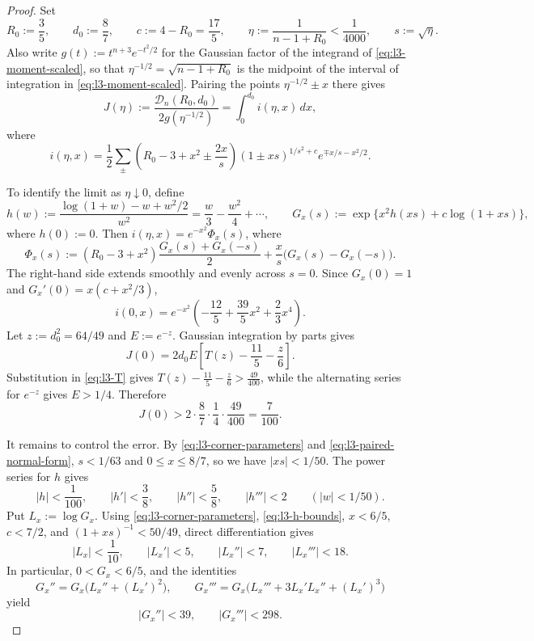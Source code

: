\documentclass[11pt]{article}
\numberwithin{equation}{section}
\theoremstyle{definition}
\begin{document}
\begin{proof}
Set
\begin{equation}\label{eq:l3-corner-parameters}
    R_0:=\frac35,\qquad d_0:=\frac87,\qquad
    c:=4-R_0=\frac{17}{5},\qquad
    \eta:=\frac1{n-1+R_0}<\frac1{4000},\qquad s:=\sqrt\eta.
\end{equation}
Also write $g(t):=t^{n+3}e^{-t^2/2}$ for the Gaussian factor of the
integrand of \eqref{eq:l3-moment-scaled}, so that
$\eta^{-1/2}=\sqrt{n-1+R_0}$ is the midpoint of the interval of
integration in \eqref{eq:l3-moment-scaled}. Pairing the points
$\eta^{-1/2}\pm x$ there gives
\begin{equation}\label{eq:l3-paired-normal-form}
 J(\eta):=\frac{\mathcal D_n(R_0,d_0)}{2g(\eta^{-1/2})}
 =\int_0^{d_0}i(\eta,x)\,dx,
\end{equation}
where
\[
 i(\eta,x)=\frac12\sum_{\pm}
 \left(R_0-3+x^2\pm\frac{2x}{s}\right)
 (1\pm xs)^{1/s^2+c}e^{\mp x/s-x^2/2}.
\]

To identify the limit as $\eta\downarrow0$, define
\[
 h(w):=\frac{\log(1+w)-w+w^2/2}{w^2}
 =\frac w3-\frac{w^2}4+\cdots,\qquad
 G_x(s):=\exp\{x^2h(xs)+c\log(1+xs)\},
\]
where $h(0):=0$. Then $i(\eta,x)=e^{-x^2}\Phi_x(s)$, where
\begin{equation}\label{eq:l3-Phi}
 \Phi_x(s):=(R_0-3+x^2)\frac{G_x(s)+G_x(-s)}2
 +\frac{x}{s}\bigl(G_x(s)-G_x(-s)\bigr).
\end{equation}
The right-hand side extends smoothly and evenly across $s=0$. Since
$G_x(0)=1$ and $G_x'(0)=x(c+x^2/3)$,
\[
 i(0,x)=e^{-x^2}\left(-\frac{12}{5}+\frac{39}{5}x^2
 +\frac23x^4\right).
\]
Let $z:=d_0^2=64/49$ and $E:=e^{-z}$. Gaussian integration by parts gives
\[
 J(0)=2d_0E\left[T(z)-\frac{11}{5}-\frac z6\right].
\]
Substitution in \eqref{eq:l3-T} gives
$T(z)-\frac{11}{5}-\frac z6>\frac{49}{400}$, while the alternating
series for $e^{-z}$ gives $E>1/4$. Therefore
\begin{equation}\label{eq:l3-J0}
    J(0)>2\cdot\frac87\cdot\frac14\cdot\frac{49}{400}
    =\frac7{100}.
\end{equation}

It remains to control the error. By \eqref{eq:l3-corner-parameters} and
\eqref{eq:l3-paired-normal-form}, $s<1/63$ and $0\leq x\leq8/7$, so
we have $|xs|<1/50$. The power series for $h$ gives
\begin{equation}\label{eq:l3-h-bounds}
 |h|<\frac1{100},\qquad |h'|<\frac38,\qquad
 |h''|<\frac58,\qquad |h'''|<2
 \qquad (|w|<1/50).
\end{equation}
Put $L_x:=\log G_x$. Using \eqref{eq:l3-corner-parameters},
\eqref{eq:l3-h-bounds}, $x<6/5$, $c<7/2$, and
$(1+xs)^{-1}<50/49$, direct differentiation gives
\[
 |L_x|<\frac1{10},\qquad |L_x'|<5,\qquad
 |L_x''|<7,\qquad |L_x'''|<18.
\]
In particular, $0<G_x<6/5$, and the identities
\[
 G_x''=G_x\bigl(L_x''+(L_x')^2\bigr),\qquad
 G_x'''=G_x\bigl(L_x'''+3L_x'L_x''+(L_x')^3\bigr)
\]
yield
\begin{equation}\label{eq:l3-G-derivative-bounds}
 |G_x''|<39,\qquad |G_x'''|<298.
\end{equation}


\end{proof}
\end{document}

